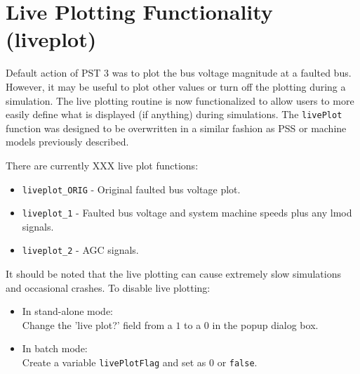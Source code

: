 \section{Live Plotting Functionality (liveplot)} 
Default action of PST 3 was to plot the bus voltage magnitude at a faulted bus.
However, it may be useful to plot other values or turn off the plotting during a simulation.
The live plotting routine is now functionalized to allow users to more easily define what is displayed (if anything) during simulations.
The \verb|livePlot| function was designed to be overwritten in a similar fashion as PSS or machine models previously described.

There are currently XXX live plot functions:

\begin{itemize}
\item \verb|liveplot_ORIG| - Original faulted bus voltage plot.
\item \verb|liveplot_1| - Faulted bus voltage and system machine speeds plus any lmod signals.
\item \verb|liveplot_2| - AGC signals.
\end{itemize}

It should be noted that the live plotting can cause extremely slow simulations and occasional crashes.
To disable live plotting:
\begin{itemize}
\item In stand-alone mode: \\Change the 'live plot?' field from a $1$ to a $0$ in the popup dialog box.
\item In batch mode:  \\Create a variable \verb|livePlotFlag| and set as $0$ or \verb|false|.
\end{itemize}